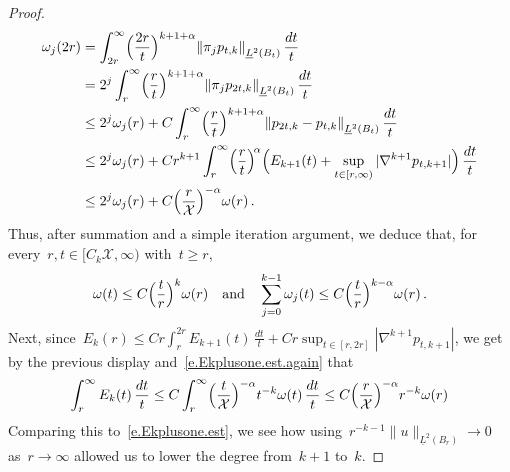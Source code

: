 \documentclass[11pt,twoside]{article} %
\numberwithin{equation}{section}
\theoremstyle{definition}
\let\originalleft\left
\let\originalright\right
\renewcommand{\left}{\mathopen{}\mathclose\bgroup\originalleft}
\renewcommand{\right}{\aftergroup\egroup\originalright}
\newcommand{\qand}{\quad \mbox{and} \quad }
\newcommand{\X}{\mathcal{X}}
\begin{document}
\begin{proof}
\begin{align} \notag %
\omega_j(2r)  & 
= 
\int_{2r}^\infty \Bigl( \frac{2r}{t} \Bigr)^{k+1+\alpha} \left\| \pi_j p_{t,k} \right\|_{\underline{L}^2(B_t)} \, \frac{dt}{t} 
\notag \\ &
=
2^j 
\int_{r}^\infty \Bigl( \frac{r}{t} \Bigr)^{k+1+\alpha} \left\| \pi_j p_{2 t,k} \right\|_{\underline{L}^2(B_{t})} \, \frac{dt}{t} 
\notag \\ &
\leq 
2^j \omega_j(r) 
+ 
C 
\int_{r}^\infty \Bigl( \frac{r}{t} \Bigr)^{k+1+\alpha} \left\| p_{2 t,k} - p_{t,k} \right\|_{\underline{L}^2(B_{t})} \, \frac{dt}{t} 
\notag \\ &
\leq 
2^j \omega_j(r) 
+
C r^{k+1}
\int_{r}^\infty  \Bigl( \frac{r}{t} \Bigr)^{\! \alpha} \Bigl( E_{k+1}(t)  +  \sup_{t \in [r ,\infty) }|\nabla^{k+1} p_{t,k+1}| \Bigr) \, \frac{dt}{t}
\notag \\ &
\leq 
2^j \omega_j(r)  + C \Bigl( \frac{r}{\X} \Bigr)^{-\alpha} \omega(r)
\notag
\,.
\end{align}
Thus, after summation and a simple iteration argument, we deduce that, for every~$r,t \in [C_k\X,\infty)$ with~$t\geq r$, 
\begin{equation}  \label{e.omega.bounds}
 \omega(t) \leq C \Bigl( \frac{t}{r} \Bigr)^k  \omega(r) 
 \qand
 \sum_{j=0}^{k-1} \omega_j(t) 
 \leq
 C \Bigl( \frac{t}{r} \Bigr)^{k-\alpha} \omega(r) 
 \,. 
\end{equation} 
Next, since~$E_k(r) \leq Cr \int_{r}^{2r} E_{k+1}(t) \, \frac{dt}{t} + C r \sup_{t \in [r ,2r] }|\nabla^{k+1} p_{t,k+1}|$, 
we get by the previous display and~\eqref{e.Ekplusone.est.again} that
\begin{equation}  \label{e.Ek.est}
\int_{r}^\infty E_k(t) \, \frac{dt}{t} 
\leq 
C \int_{r}^\infty \Bigl( \frac{t}{\X} \Bigr)^{-\alpha} t^{-k} \omega(t) \, \frac{dt}{t}  
\leq  
C \Bigl( \frac{r}{\X} \Bigr)^{-\alpha} r^{-k} \omega(r) 
\end{equation}
Comparing this to~\eqref{e.Ekplusone.est}, we see how using~$r^{-k-1} \| u \|_{\underline{L}^{2}(B_r)} \to 0$ as~$r \to \infty$ allowed us to lower the degree from~$k+1$ to~$k$. 





\end{proof}
\end{document}
